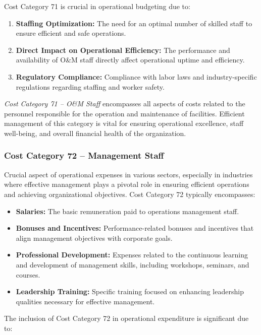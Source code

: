 Cost Category 71 is crucial in operational budgeting due to:

\begin{enumerate}
    \item \textbf{Staffing Optimization:} The need for an optimal number of skilled staff to ensure efficient and safe operations.
    \item \textbf{Direct Impact on Operational Efficiency:} The performance and availability of O\&M staff directly affect operational uptime and efficiency.
    \item \textbf{Regulatory Compliance:} Compliance with labor laws and industry-specific regulations regarding staffing and worker safety.
\end{enumerate}

\textit{Cost Category 71 – O\&M Staff} encompasses all aspects of costs related to the personnel responsible for the operation and maintenance of facilities. Efficient management of this category is vital for ensuring operational excellence, staff well-being, and overall financial health of the organization.


\subsubsection*{Cost Category 72 – Management Staff}
Crucial aspect of operational expenses in various sectors, especially in industries where effective management plays a pivotal role in ensuring efficient operations and achieving organizational objectives.  Cost Category 72 typically encompasses:

\begin{itemize}
    \item \textbf{Salaries:} The basic remuneration paid to operations management staff.
    \item \textbf{Bonuses and Incentives:} Performance-related bonuses and incentives that align management objectives with corporate goals.
    \item \textbf{Professional Development:} Expenses related to the continuous learning and development of management skills, including workshops, seminars, and courses.
    \item \textbf{Leadership Training:} Specific training focused on enhancing leadership qualities necessary for effective management.
\end{itemize}

The inclusion of Cost Category 72 in operational expenditure is significant due to:

